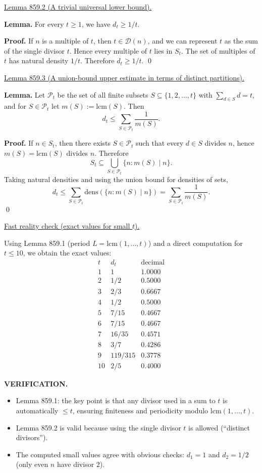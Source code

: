 \medskip
\noindent\underline{Lemma 859.2 (A trivial universal lower bound).}

\textbf{Lemma.}
For every $t\ge 1$, we have $d_t\ge 1/t$.

\textbf{Proof.}
If $n$ is a multiple of $t$, then $t\in\mathcal D(n)$, and we can represent $t$ as the sum of the single divisor $t$. Hence every multiple of $t$ lies in $S_t$.
The set of multiples of $t$ has natural density $1/t$.
Therefore $d_t\ge 1/t$.
\qed

\medskip
\noindent\underline{Lemma 859.3 (A union-bound upper estimate in terms of distinct partitions).}

\textbf{Lemma.}
Let $\mathcal P_t$ be the set of all finite subsets $S\subseteq\{1,2,\dots,t\}$ with $\sum_{d\in S} d=t$, and for $S\in\mathcal P_t$ let $m(S):=\mathrm{lcm}(S)$.
Then
\[
 d_t \le \sum_{S\in\mathcal P_t} \frac{1}{m(S)}.
\]

\textbf{Proof.}
If $n\in S_t$, then there exists $S\in\mathcal P_t$ such that every $d\in S$ divides $n$, hence $m(S)=\mathrm{lcm}(S)$ divides $n$.
Therefore
\[
S_t \subseteq \bigcup_{S\in\mathcal P_t} \{n: m(S)\mid n\}.
\]
Taking natural densities and using the union bound for densities of sets,
\[
 d_t \le \sum_{S\in\mathcal P_t} \mathrm{dens}(\{n: m(S)\mid n\}) = \sum_{S\in\mathcal P_t} \frac{1}{m(S)}.
\]
\qed

\medskip
\noindent\underline{Fast reality check (exact values for small $t$).}

Using Lemma 859.1 (period $L=\mathrm{lcm}(1,\dots,t)$) and a direct computation for $t\le 10$, we obtain the exact values:
\[
\begin{array}{c|c|c}
 t & d_t & \text{decimal}\\\hline
 1 & 1 & 1.0000\\
 2 & 1/2 & 0.5000\\
 3 & 2/3 & 0.6667\\
 4 & 1/2 & 0.5000\\
 5 & 7/15 & 0.4667\\
 6 & 7/15 & 0.4667\\
 7 & 16/35 & 0.4571\\
 8 & 3/7 & 0.4286\\
 9 & 119/315 & 0.3778\\
 10 & 2/5 & 0.4000
\end{array}
\]

\medskip
\noindent\textbf{VERIFICATION.}

\begin{itemize}
\item Lemma 859.1: the key point is that any divisor used in a sum to $t$ is automatically $\le t$, ensuring finiteness and periodicity modulo $\mathrm{lcm}(1,\dots,t)$.
\item Lemma 859.2 is valid because using the single divisor $t$ is allowed (``distinct divisors'').
\item The computed small values agree with obvious checks: $d_1=1$ and $d_2=1/2$ (only even $n$ have divisor $2$).
\end{itemize}

